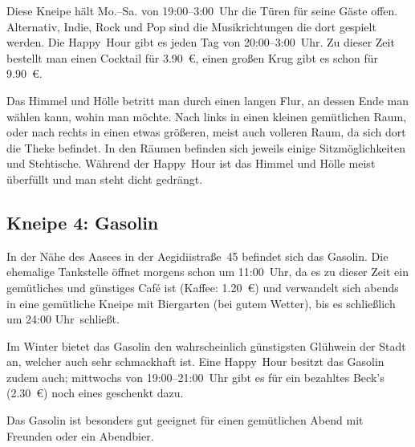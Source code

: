 \begin{multicols*}{2}
Diese Kneipe hält Mo.--Sa. von 19:00--3:00~Uhr die Türen für seine Gäste offen. Alternativ, Indie, Rock und Pop sind die Musikrichtungen die dort gespielt werden. Die Happy~Hour gibt es jeden Tag von 20:00--3:00~Uhr. Zu dieser Zeit bestellt man einen Cocktail für \SI{3,90}{\euro}, einen großen Krug gibt es schon für \SI{9,90}{\euro}.

Das Himmel und Hölle betritt man durch einen langen Flur, an dessen Ende man wählen kann, wohin man möchte. Nach links in einen kleinen gemütlichen Raum, oder nach rechts in einen etwas größeren, meist auch volleren Raum, da sich dort die Theke befindet. In den Räumen befinden sich jeweils einige Sitzmöglichkeiten und Stehtische. Während der Happy~Hour ist das Himmel und Hölle meist überfüllt und man steht dicht gedrängt.

\begin{center}
\end{center}

\subsection*{Kneipe 4: Gasolin}
In der Nähe des Aasees in der Aegidiistraße~45 befindet sich das Gasolin. Die ehemalige Tankstelle öffnet morgens schon um 11:00~Uhr, da es zu dieser Zeit ein gemütliches und günstiges Café ist (Kaffee: \SI{1,20}{\euro}) und verwandelt sich abends in eine gemütliche Kneipe mit Biergarten (bei gutem Wetter), bis es schließlich um 24:00 Uhr~schließt.

Im Winter bietet das Gasolin den wahrscheinlich günstigsten Glühwein der Stadt an, welcher auch sehr schmackhaft ist. Eine Happy~Hour besitzt das Gasolin zudem auch; mittwochs von 19:00--21:00~Uhr gibt es für ein bezahltes Beck's (\SI{2,30}{\euro}) noch eines geschenkt dazu.

Das Gasolin ist besonders gut geeignet für einen gemütlichen Abend mit Freunden oder ein Abendbier.

\begin{center}
\end{center}


\end{multicols*}
